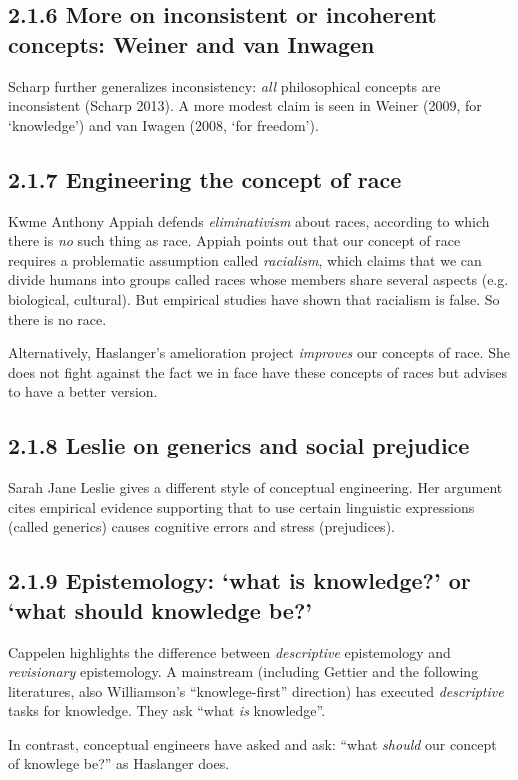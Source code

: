 \documentclass[
10pt, %
a4paper, %
twocolumn, %
landscape %
]{article}
\begin{document}
\subsection*{2.1.6 More on inconsistent or incoherent concepts: Weiner and van Inwagen}
Scharp further generalizes inconsistency: \emph{all} philosophical concepts are inconsistent (Scharp 2013).
A more modest claim is seen in Weiner (2009, for `knowledge') and van Iwagen (2008, `for freedom').

\subsection*{2.1.7 Engineering the concept of race}
Kwme Anthony Appiah defends \emph{eliminativism} about races, according to which there is \emph{no} such thing as race.
Appiah points out that our concept of race requires a problematic assumption called \emph{racialism}, which claims that we can divide humans into groups called races whose members share several aspects (e.g. biological, cultural).
But empirical studies have shown that racialism is false. So there is no race.

Alternatively, Haslanger's amelioration project \emph{improves} our concepts of race. She does not fight against the fact we in face have these concepts of races but advises to have a better version.

\subsection*{2.1.8 Leslie on generics and social prejudice}

Sarah Jane Leslie gives a different style of conceptual engineering.
Her argument cites empirical evidence supporting that to use certain linguistic expressions (called generics) causes cognitive errors and stress (prejudices).

\subsection*{2.1.9 Epistemology: `what is knowledge?' or `what should knowledge be?'}

Cappelen highlights the difference between \emph{descriptive} epistemology and \emph{revisionary} epistemology.
A mainstream (including Gettier and the following literatures, also Williamson's ``knowlege-first'' direction) has executed \emph{descriptive} tasks for knowledge. They ask ``what \emph{is} knowledge''.

In contrast, conceptual engineers have asked and ask: ``what \emph{should} our concept of knowlege be?'' as Haslanger does.
\end{document}
